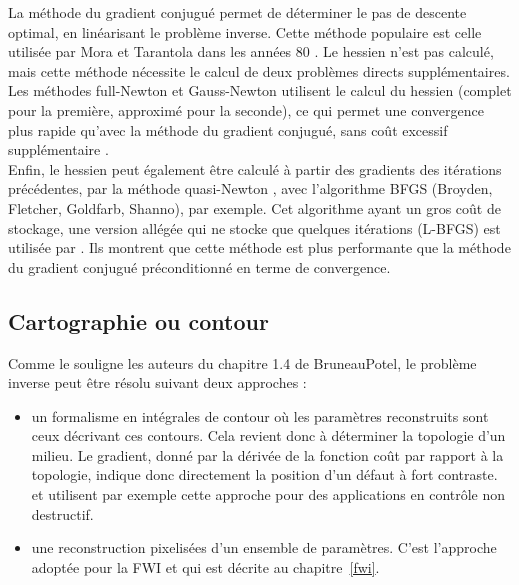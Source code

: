 La méthode du gradient conjugué permet de déterminer le pas de descente optimal, en linéarisant le problème inverse. Cette méthode populaire est celle utilisée par Mora et Tarantola dans les années 80 \citep{tarantola_84, mora_87a, mora_87b}. Le hessien n'est pas calculé, mais cette méthode nécessite le calcul de deux problèmes directs supplémentaires. \\

Les méthodes full-Newton et Gauss-Newton utilisent le calcul du hessien (complet pour la première, approximé pour la seconde), ce qui permet une convergence plus rapide qu'avec la méthode du gradient conjugué, sans coût excessif supplémentaire \citep{pratt_98}.\\

Enfin, le hessien peut également être calculé à partir des gradients des itérations précédentes, par la méthode quasi-Newton \citep{nocedal}, avec l'algorithme BFGS (Broyden, Fletcher, Goldfarb, Shanno), par exemple. Cet algorithme ayant un gros coût de stockage, une version allégée qui ne stocke que quelques itérations (L-BFGS) est utilisée par \cite{brossier_2009}. Ils montrent que cette méthode est plus performante que la méthode du gradient conjugué préconditionné en terme de convergence. \\

\subsection{Cartographie ou contour}
Comme le souligne les auteurs du chapitre 1.4 de BruneauPotel, le problème inverse peut être résolu suivant deux approches : 
\begin{itemize}
	\item un formalisme en intégrales de contour où les paramètres reconstruits sont ceux décrivant ces contours. Cela revient donc à déterminer la topologie d'un milieu. Le gradient, donné par la dérivée de la fonction coût par rapport à la topologie, indique donc directement la position d'un défaut à fort contraste. \cite{dominguez} et \cite{rodriguez} utilisent par exemple cette approche pour des applications en contrôle non destructif.
	\item une reconstruction pixelisées d'un ensemble de paramètres. C'est l'approche adoptée pour la FWI et qui est décrite au chapitre~\ref{fwi}.
\end{itemize}




